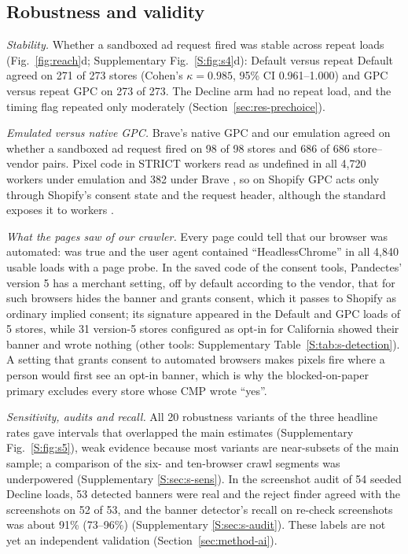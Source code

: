 \subsection{Robustness and validity}\label{sec:app-validation}

\emph{Stability.} Whether a sandboxed ad request fired was stable across repeat loads (Fig.~\ref{fig:reach}d; Supplementary Fig.~\ref*{S:fig:s4}d): Default versus repeat Default agreed on 271 of 273 stores (Cohen's $\kappa=0.985$, 95\% CI 0.961--1.000) and GPC versus repeat GPC on 273 of 273. The Decline arm had no repeat load, and the timing flag repeated only moderately (Section~\ref{sec:res-prechoice}).

\emph{Emulated versus native GPC.} Brave's native GPC and our emulation agreed on whether a sandboxed ad request fired on 98 of 98 stores and 686 of 686 store--vendor pairs. Pixel code in STRICT workers read  as undefined in all 4,720 workers under emulation and 382 under Brave \citep{shopify_aboutpixels}, so on Shopify GPC acts only through Shopify's consent state and the request header, although the standard exposes it to workers \citep{w3c_gpc}.

\emph{What the pages saw of our crawler.} Every page could tell that our browser was automated:  was true and the user agent contained ``HeadlessChrome'' in all 4,840 usable loads with a page probe. In the saved code of the consent tools, Pandectes' version 5 has a merchant setting, off by default according to the vendor, that for such browsers hides the banner and grants consent, which it passes to Shopify as ordinary implied consent; its signature appeared in the Default and GPC loads of 5 stores, while 31 version-5 stores configured as opt-in for California showed their banner and wrote nothing (other tools: Supplementary Table~\ref*{S:tab:s-detection}). A setting that grants consent to automated browsers makes pixels fire where a person would first see an opt-in banner, which is why the blocked-on-paper primary excludes every store whose CMP wrote ``yes''.

\emph{Sensitivity, audits and recall.} All 20 robustness variants of the three headline rates gave intervals that overlapped the main estimates (Supplementary Fig.~\ref*{S:fig:s5}), weak evidence because most variants are near-subsets of the main sample; a comparison of the six- and ten-browser crawl segments was underpowered (Supplementary \ref*{S:sec:s-sens}). In the screenshot audit of 54 seeded Decline loads, 53 detected banners were real and the reject finder agreed with the screenshots on 52 of 53, and the banner detector's recall on re-check screenshots was about 91\% (73--96\%) (Supplementary \ref*{S:sec:s-audit}). These labels are not yet an independent validation (Section~\ref{sec:method-ai}).

